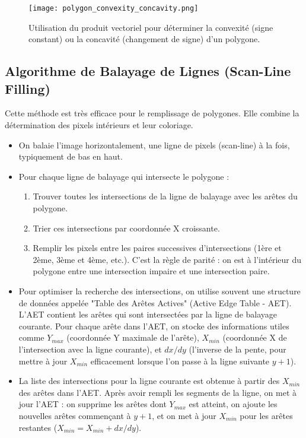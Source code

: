 \documentclass{article}
\begin{document}
\begin{figure}[H]
\centering
\texttt{[image: polygon\_convexity\_concavity.png]}
\caption{Utilisation du produit vectoriel pour déterminer la convexité (signe constant) ou la concavité (changement de signe) d'un polygone.}
\label{fig:polygon_convexity_concavity}
\end{figure}


\subsection{Algorithme de Balayage de Lignes (Scan-Line Filling)}

Cette méthode est très efficace pour le remplissage de polygones. Elle combine la détermination des pixels intérieurs et leur coloriage.
\begin{itemize}
    \item On balaie l'image horizontalement, une ligne de pixels (scan-line) à la fois, typiquement de bas en haut.
    \item Pour chaque ligne de balayage qui intersecte le polygone :
        \begin{enumerate}
            \item Trouver toutes les intersections de la ligne de balayage avec les arêtes du polygone.
            \item Trier ces intersections par coordonnée X croissante.
            \item Remplir les pixels entre les paires successives d'intersections (1ère et 2ème, 3ème et 4ème, etc.). C'est la règle de parité : on est à l'intérieur du polygone entre une intersection impaire et une intersection paire.
        \end{enumerate}
    \item Pour optimiser la recherche des intersections, on utilise souvent une structure de données appelée "Table des Arêtes Actives" (Active Edge Table - AET). L'AET contient les arêtes qui sont intersectées par la ligne de balayage courante. Pour chaque arête dans l'AET, on stocke des informations utiles comme $Y_{max}$ (coordonnée Y maximale de l'arête), $X_{min}$ (coordonnée X de l'intersection avec la ligne courante), et $dx/dy$ (l'inverse de la pente, pour mettre à jour $X_{min}$ efficacement lorsque l'on passe à la ligne suivante $y+1$).
    \item La liste des intersections pour la ligne courante est obtenue à partir des $X_{min}$ des arêtes dans l'AET. Après avoir rempli les segments de la ligne, on met à jour l'AET : on supprime les arêtes dont $Y_{max}$ est atteint, on ajoute les nouvelles arêtes commençant à $y+1$, et on met à jour $X_{min}$ pour les arêtes restantes ($X_{min} = X_{min} + dx/dy$).
\end{itemize}
\end{document}
